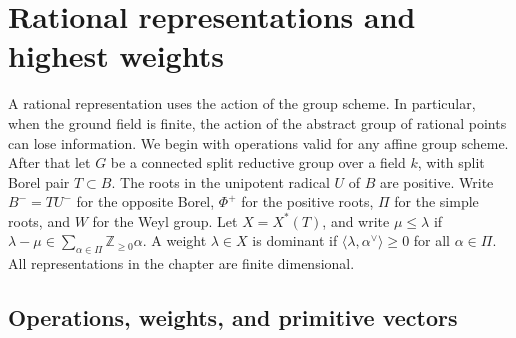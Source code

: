 \documentclass[11pt,a4paper,openany,oneside]{book}
\theoremstyle{resultstyle}
\theoremstyle{definition}
\numberwithin{equation}{chapter}
\begin{document}
\chapter{Rational representations and highest weights}
\label{ch:representations}

A rational representation uses the action of the group scheme. In particular, when the ground field is finite, the action of the abstract group of rational points can lose information. We begin with operations valid for any affine group scheme. After that let \(G\) be a connected split reductive group over a field \(k\), with split Borel pair \(T\subset B\). The roots in the unipotent radical \(U\) of \(B\) are positive. Write \(B^-=TU^-\) for the opposite Borel, \(\Phi^+\) for the positive roots, \(\Pi\) for the simple roots, and \(W\) for the Weyl group. Let \(X=X^*(T)\), and write \(\mu\leq\lambda\) if \(\lambda-\mu\in\sum_{\alpha\in\Pi}\mathbb Z_{\geq 0}\alpha\). A weight \(\lambda\in X\) is dominant if \(\langle\lambda,\alpha^\vee\rangle\geq 0\) for all \(\alpha\in\Pi\). All representations in the chapter are finite dimensional.

\section{Operations, weights, and primitive vectors}
\end{document}

